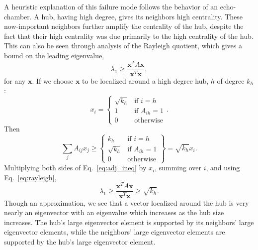 \documentclass[twocolumn,prl,superscriptaddress]{revtex4}
\renewcommand{\vec}{\mathbf}
\begin{document}
A heuristic explanation of this failure mode follows the behavior of an echo-chamber.
A hub, having high degree, gives its neighbors high centrality. These now-important neighbors further amplify the centrality of the hub, despite the fact that their high centrality was due primarily to the high centrality of the hub.
This can also be seen through analysis of the Rayleigh quotient, which gives a bound on the leading eigenvalue,
\begin{equation}
\lambda_1 \geq \frac{\vec{x}^{T} A \vec{x}}{\vec{x}^T\vec{x}}, \label{eq:rayleigh}
\end{equation}
for any $\vec{x}$. If we choose $\vec{x}$ to be localized around a high degree hub, $h$ of degree $k_h$:
\begin{equation*}
x_i = 
\begin{cases}
  \sqrt{k_h} & \text{if } i=h\\
  1          & \text{if } A_{ih} = 1\\
  0          & \text{otherwise}
\end{cases}.
\end{equation*}
Then
\begin{equation}
\sum_j A_{ij} x_j \geq
  \left.\begin{cases}
  k_h & \text{if } i=h\\
  \sqrt{k_h} & \text{if } A_{ih} = 1\\
  0          & \text{otherwise}
  \end{cases} \right\} = \sqrt{k_h} x_i.
  \label{eq:adj_ineq}
\end{equation}
Multiplying both sides of Eq.~\eqref{eq:adj_ineq} by $x_i$, summing over $i$, and using Eq.~\eqref{eq:rayleigh},
\begin{equation*}
\lambda_1 \geq \frac{\vec{x}^{T} A \vec{x}}{\vec{x}^T\vec{x}} \geq \sqrt{k_h}.
\end{equation*}
Though an approximation, we see that a vector localized around the hub is very nearly an eigenvector with an eigenvalue which increases as the hub size increases. The hub's large eigenvector element is supported by its neighbors' large eigenvector elements, while the neighbors' large eigenvector elements are supported by the hub's large eigenvector element.
\end{document}

